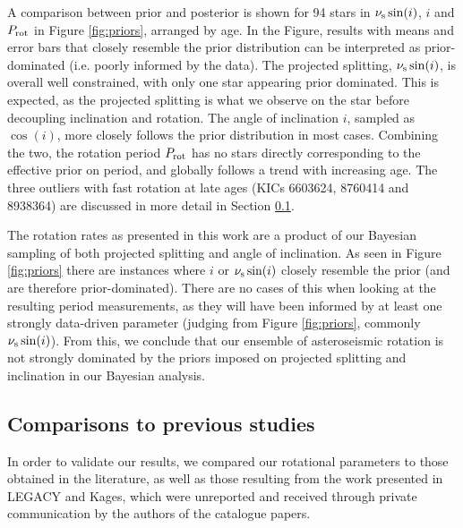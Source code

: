 A comparison between prior and posterior is shown for 94 stars in $\nu_{\rm s}\sin(i)$, $i$ and $P_{\rm rot}$ in Figure \ref{fig:priors}, arranged by age. In the Figure, results with means and error bars that closely resemble the prior distribution can be interpreted as prior-dominated (i.e. poorly informed by the data). The projected splitting, $\nu_{\rm s}\sin(i)$, is overall well constrained, with only one star appearing prior dominated. This is expected, as the projected splitting is what we observe on the star before decoupling inclination and rotation. The angle of inclination $i$, sampled as $\cos(i)$, more closely follows the prior distribution in most cases. Combining the two, the rotation period $P_{\rm rot}$ has no stars directly corresponding to the effective prior on period, and globally follows a trend with increasing age. The three outliers with fast rotation at late ages (KICs 6603624, 8760414 and 8938364) are discussed in more detail in Section \ref{ssec:litcomp}.

The rotation rates as presented in this work are a product of our Bayesian sampling of both projected splitting and angle of inclination. As seen in Figure \ref{fig:priors} there are instances where $i$ or $\nu_{\rm s}\sin(i)$ closely resemble the prior (and are therefore prior-dominated). There are no cases of this when looking at the resulting period measurements, as they will have been informed by at least one strongly data-driven parameter (judging from Figure \ref{fig:priors}, commonly $\nu_{\rm s}\sin(i)$). From this, we conclude that our ensemble of asteroseismic rotation is not strongly dominated by the priors imposed on projected splitting and inclination in our Bayesian analysis.

\subsection{Comparisons to previous studies}\label{ssec:litcomp}
In order to validate our results, we compared our rotational parameters to those obtained in the literature, as well as those resulting from the work presented in LEGACY and Kages, which were unreported and received through private communication by the authors of the catalogue papers.

